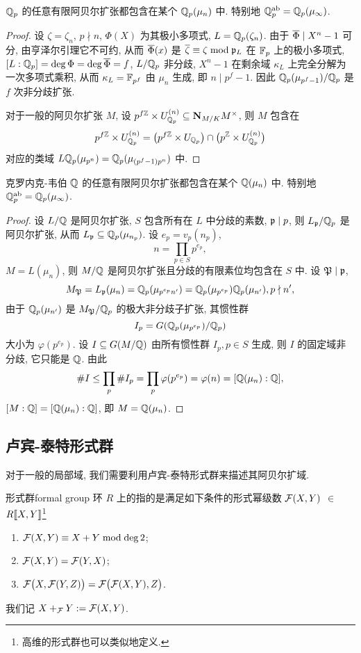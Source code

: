 \begin{corollary}{}{}
${\mathbb{Q}}_p$ 的任意有限阿贝尔扩张都包含在某个 ${\mathbb{Q}}_p(\mu_n)$ 中. 特别地 ${\mathbb{Q}}_p^{\mathrm{ab}}={\mathbb{Q}}_p(\mu_\infty)$.
\end{corollary}
\begin{proof}
设 $\zeta=\zeta_n$, $p\nmid n$, $\Phi(X)$ 为其极小多项式, $L={\mathbb{Q}}_p(\zeta_n)$. 由于 $\overline\Phi\mid X^n-1$ 可分, 由亨泽尔引理它不可约, 从而 $\overline\Phi(x)$ 是 $\overline\zeta\equiv \zeta\bmod{\mathfrak{p}}_L$ 在 ${\mathbb{F}}_p$ 上的极小多项式, $[L:{\mathbb{Q}}_p]=\deg\Phi=\deg\overline\Phi=f$, $L/{\mathbb{Q}}_p$ 非分歧, $X^n-1$ 在剩余域 $\kappa_L$ 上完全分解为一次多项式乘积, 从而 $\kappa_L={\mathbb{F}}_{p^f}$ 由 $\mu_n$ 生成, 即 $n\mid p^f-1$. 因此 ${\mathbb{Q}}_p(\mu_{p^f-1})/{\mathbb{Q}}_p$ 是 $f$ 次非分歧扩张.

对于一般的阿贝尔扩张 $M$, 设 $p^{f{\mathbb{Z}}}\times U_{{\mathbb{Q}}_p}^{(n)}\subseteq {\mathbf{N}}_{M/K}M^\times$, 则 $M$ 包含在
  \[p^{f{\mathbb{Z}}}\times U_{{\mathbb{Q}}_p}^{(n)}=\bigl(p^{f{\mathbb{Z}}}\times U_{{\mathbb{Q}}_p}\bigr)\cap \bigl(p^{{\mathbb{Z}}}\times U_{{\mathbb{Q}}_p}^{(n)}\bigr)\]
对应的类域 $L{\mathbb{Q}}_p(\mu_{p^n})={\mathbb{Q}}_p(\mu_{(p^f-1)p^n})$ 中.
\end{proof}

\begin{theorem}{克罗内克-韦伯}{}
${\mathbb{Q}}$ 的任意有限阿贝尔扩张都包含在某个 ${\mathbb{Q}}(\mu_n)$ 中. 特别地 ${\mathbb{Q}}_p^{\mathrm{ab}}={\mathbb{Q}}_p(\mu_\infty)$.
\end{theorem}
\begin{proof}
设 $L/{\mathbb{Q}}$ 是阿贝尔扩张, $S$ 包含所有在 $L$ 中分歧的素数, ${\mathfrak{p}}\mid p$, 则 $L_{\mathfrak{p}}/{\mathbb{Q}}_p$ 是阿贝尔扩张, 从而 $L_{\mathfrak{p}}\subseteq {\mathbb{Q}}_p(\mu_{n_p})$. 设 $e_p=v_p(n_p)$, 
  \[n=\prod_{p\in S}p^{e_p},\]
$M=L(\mu_n)$, 则 $M/{\mathbb{Q}}$ 是阿贝尔扩张且分歧的有限素位均包含在 $S$ 中. 设 ${\mathfrak{P}}\mid {\mathfrak{p}}$,
  \[M_{\mathfrak{P}}=L_{\mathfrak{p}}(\mu_n)={\mathbb{Q}}_p(\mu_{p^{e_p}n'})={\mathbb{Q}}_p(\mu_{p^{e_p}}){\mathbb{Q}}_p(\mu_{n'}),p\nmid n',\]
由于 ${\mathbb{Q}}_p(\mu_{n'})$ 是 $M_{\mathfrak{P}}/{\mathbb{Q}}_p$ 的极大非分歧子扩张, 其惯性群
  \[I_p=G({\mathbb{Q}}_p(\mu_{p^{e_p}})/{\mathbb{Q}}_p)\]
大小为 $\varphi(p^{e_p})$. 设 $I\subseteq G(M/{\mathbb{Q}})$ 由所有惯性群 $I_p,p\in S$ 生成, 则 $I$ 的固定域非分歧, 它只能是 ${\mathbb{Q}}$. 由此
  \[\#I\le\prod_p\# I_p=\prod_p \varphi(p^{e_p})=\varphi(n)=[{\mathbb{Q}}(\mu_n):{\mathbb{Q}}],\]
$[M:{\mathbb{Q}}]=[{\mathbb{Q}}(\mu_n):{\mathbb{Q}}]$, 即 $M={\mathbb{Q}}(\mu_n)$.
\end{proof}

\subsection{卢宾-泰特形式群}

对于一般的局部域, 我们需要利用卢宾-泰特形式群来描述其阿贝尔扩域. 

\begin{definition}{形式群}{formal group}
环 $R$ 上的指的是满足如下条件的形式幂级数 ${\mathcal{F}}(X,Y)$ $\in$ $R\llbracket X,Y\rrbracket$\footnote{高维的形式群也可以类似地定义.}
\begin{enumerate}
\item ${\mathcal{F}}(X,Y)\equiv X+Y\bmod\deg 2$;
\item ${\mathcal{F}}(X,Y)={\mathcal{F}}(Y,X)$;
\item ${\mathcal{F}}\bigl(X,{\mathcal{F}}(Y,Z)\bigr)={\mathcal{F}}\bigl({\mathcal{F}}(X,Y),Z\bigr)$.
\end{enumerate}
我们记 $X+_{\mathcal{F}} Y:={\mathcal{F}}(X,Y)$.
\end{definition}

